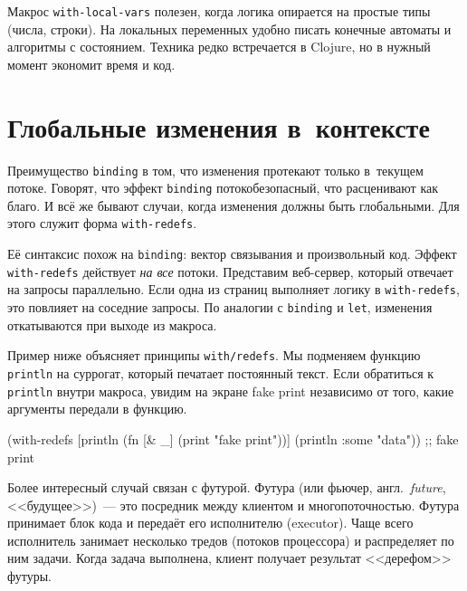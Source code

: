 \fi

Макрос \verb|with-local-vars| полезен, когда логика опирается на простые типы
(числа, строки). На локальных переменных удобно писать конечные автоматы и
алгоритмы с состоянием. Техника редко встречается в Clojure, но в нужный момент
экономит время и код.

\section{Глобальные изменения в~контексте}


\label{with-redefs}

Преимущество \verb|binding| в том, что изменения протекают только в~текущем
потоке. Говорят, что эффект \verb|binding| потокобезопасный, что расценивают
как благо. И всё же бывают случаи, когда изменения должны быть глобальными. Для
этого служит форма \verb|with-redefs|.

Её синтаксис похож на \verb|binding|: вектор связывания и произвольный
код. Эффект \verb|with-redefs| действует \emph{на все} потоки. Представим
веб-сервер, который отвечает на запросы параллельно. Если одна из страниц
выполняет логику в \verb|with-redefs|, это повлияет на соседние
запросы. По аналогии с \verb|binding| и \verb|let|, изменения откатываются при
выходе из макроса.

Пример ниже объясняет принципы \texttt{with\-/redefs}. Мы подменяем функцию
\verb|println| на суррогат, который печатает постоянный текст. Если обратиться к
\verb|println| внутри макроса, увидим на экране fake print независимо от того,
какие аргументы передали в функцию.

\begin{english}
  \begin{clojure}
(with-redefs [println
              (fn [& _]
                (print "fake print\n"))]
  (println {:some "data"}))
;; fake print
  \end{clojure}
\end{english}


Более интересный случай связан с футурой. Футура (или фьючер,
англ.~\emph{future}, <<будущее>>)~--- это посредник между клиентом и
многопоточностью. Футура принимает блок кода и передаёт его исполнителю
(executor). Чаще всего исполнитель занимает несколько тредов (потоков
процессора) и распределяет по ним задачи. Когда задача выполнена, клиент
получает результат <<дерефом>> футуры.

